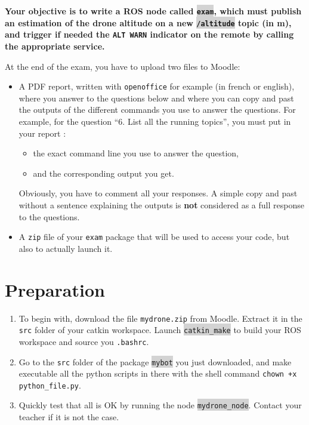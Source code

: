\documentclass[10pt,a4paper,english]{exam}
\newcounter{mainmemorder}
\newcommand{\save}{\setcounter{mainmemorder}{\value{enumi}}}
\newcommand{\mytext}[1]{\colorbox{lightgray}{\texttt{#1}}}
\begin{document}
\textbf{Your objective is to write a ROS node called \mytext{exam}, which must publish an estimation
	of the drone altitude on a new \mytext{/altitude} topic (in m), and trigger if needed the
	\texttt{ALT WARN} indicator on the remote by calling the appropriate service.\\}

\begin{mdframed}[style=evaluation]
	At the end of the exam, you have to upload two files to Moodle:
	\begin{itemize}
		\item A PDF report, written with \texttt{openoffice} for example (in french or english), where
		      you answer to the questions below and where you can copy and past the outputs of the
		      different commands you use to answer the questions. For example, for the question ``6.
		      List all the running topics'', you must put in your report :
		      \begin{itemize}
			      \item the exact command line you use to answer the question,
			      \item and the corresponding output you get.
		      \end{itemize}
		      Obviously, you have to comment all your responses. A simple copy and past without a
		      sentence explaining the outputs is \textbf{not} considered as a full response to the
		      questions.
		\item A \texttt{zip} file of your \texttt{exam} package that will be used to access your
		      code, but also to actually launch it.
	\end{itemize}
\end{mdframed}

\section*{Preparation}
\begin{enumerate}
	\item To begin with, download the file \texttt{mydrone.zip} from Moodle. Extract it in the
	      \texttt{src} folder of your catkin workspace. Launch \mytext{catkin\_make} to build your
	      ROS workspace and source you \texttt{.bashrc}.
	\item Go to the \texttt{src} folder of the package \mytext{mybot} you just downloaded, and make
	      executable all the python scripts in there with the shell command \texttt{chown +x
		      python\_file.py}.
	\item Quickly test that all is OK by running the node \mytext{mydrone\_node}. Contact your
	      teacher if it is not the case.
	      \save
\end{enumerate}
\end{document}
